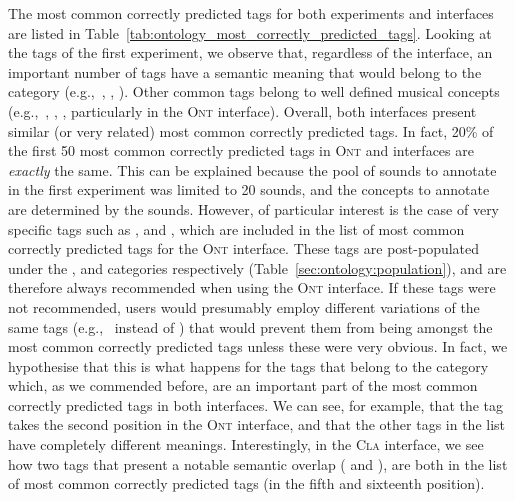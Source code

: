 The most common correctly predicted tags for both experiments and interfaces are listed in Table~\ref{tab:ontology_most_correctly_predicted_tags}.
Looking at the tags of the first experiment, we observe that, regardless of the interface, an important number of tags have a semantic meaning that would belong to the  category (e.g.,~, , ). Other common tags belong to well defined musical concepts (e.g.,~, , , particularly in the \textsc{Ont} interface). Overall, both interfaces present similar (or very related) most common correctly predicted tags. In fact, 20\% of the first 50 most common correctly predicted tags in \textsc{Ont} and  interfaces are \emph{exactly} the same. 
This can be explained because the pool of sounds to annotate in the first experiment was limited to 20 sounds, and the concepts to annotate are determined by the sounds. 
However, of particular interest is the case of very specific tags such as ,  and , which are included in the list of most common correctly predicted tags for the \textsc{Ont} interface. 
These tags are post-populated under the ,  and  categories respectively (Table~\ref{sec:ontology:population}), and are therefore always recommended when using the \textsc{Ont} interface. If these tags were not recommended, users would presumably employ different variations of the same tags (e.g.,~ instead of ) that would prevent them from being amongst the most common correctly predicted tags unless these were very obvious. In fact, we hypothesise that this is what happens for the tags that belong to the  category which, as we commended before, are an important part of the most common correctly predicted tags in both interfaces. We can see, for example, that the tag  takes the second position in the \textsc{Ont} interface, and that the other tags in the list have completely different meanings. Interestingly, in the \textsc{Cla} interface, we see how two tags that present a notable semantic overlap ( and ), are both in the list of most common correctly predicted tags (in the fifth and sixteenth position).


